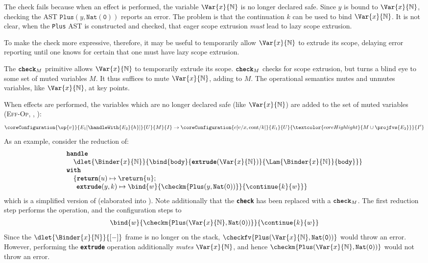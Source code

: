 The check fails because when an effect is performed, the variable $\Var{x}{\mathbb{N}}$ is no longer declared safe. Since $y$ is bound to $\Var{x}{\mathbb{N}}$, checking the AST $\texttt{Plus}(y, \texttt{Nat}(\texttt{0}))$ reports an error. The problem is that the continuation $k$ can be used to bind $\Var{x}{\mathbb{N}}$. It is not clear, when the \texttt{Plus} AST is constructed and checked, that eager scope extrusion \textit{must} lead to lazy scope extrusion. 

To make the check more expressive, therefore, it may be useful to temporarily allow $\Var{x}{\mathbb{N}}$ to extrude its scope, delaying error reporting until one knows for certain that one must have lazy scope extrusion. 

The $\textbf{\texttt{check}}_M$ primitive allows $\Var{x}{\mathbb{N}}$ to temporarily extrude its scope. $\textbf{\texttt{check}}_M$ checks for scope extrusion, but turns a blind eye to some set of muted variables $M$. It thus suffices to mute $\Var{x}{\mathbb{N}}$, adding to $M$. The \coreLang{} operational semantics mutes and unmutes variables, like $\Var{x}{\mathbb{N}}$, at key points. 

When effects are performed, the variables which are no longer declared safe (like $\Var{x}{\mathbb{N}}$) are added to the set of muted variables (\textsc{Eff-Op}, , ):
\[\coreConfiguration{\op{v}}{E_1[\handleWith{E_2}{h}]}{U}{M}{I} \to \coreConfiguration{c[v/x, \text{cont}/ k]}{E_1}{U}{\textcolor{coreHighlight}{M \cup \projfvs{E_2}}}{I'}\]
As an example, consider the reduction of:
\[\begin{array}{l}
  \textbf{\texttt{handle}} \\
  \quad {\dlet{\Binder{x}{\mathbb{N}}}{
  \bind{\texttt{body}}{\textbf{\texttt{extrude}}(\Var{x}{\mathbb{N}})}{\Lam{\Binder{x}{\mathbb{N}}}{\texttt{body}}}}} \\ 
  \textbf{\texttt{with}} \\ 
  \quad \{ \textbf{\texttt{return}}(u) \mapsto {\return{u}}; \\ 
      \quad\;\, \textbf{\texttt{extrude}}(y, k) \mapsto {\bind{w}{\checkm{\texttt{Plus}(y, \texttt{Nat}(\texttt{0}))}}{\continue{k}{w}}}\}
\end{array}\]
which is a simplified version of  (elaborated into \coreLang{}). Note additionally that the \textbf{\texttt{check}} has been replaced with a $\textbf{\texttt{check}}_M$. The first reduction step performs the operation, and the configuration steps to
\[\begin{array}{l}
  \bind{w}{\checkm{\texttt{Plus}(\Var{x}{\mathbb{N}}, \texttt{Nat}(\texttt{0}))}}{\continue{k}{w}}
\end{array}\]
Since the $\dlet{\Binder{x}{\mathbb{N}}}{[-]}$ frame is no longer on the stack, $\checkfv{\texttt{Plus}(\Var{x}{\mathbb{N}}, \texttt{Nat}(\texttt{0}))}$ would throw an error. However, performing the \textbf{\texttt{extrude}} operation additionally \textit{mutes} $\Var{x}{\mathbb{N}}$, and hence $\checkm{\texttt{Plus}(\Var{x}{\mathbb{N}}, \texttt{Nat}(\texttt{0}))}$  would not throw an error. 

